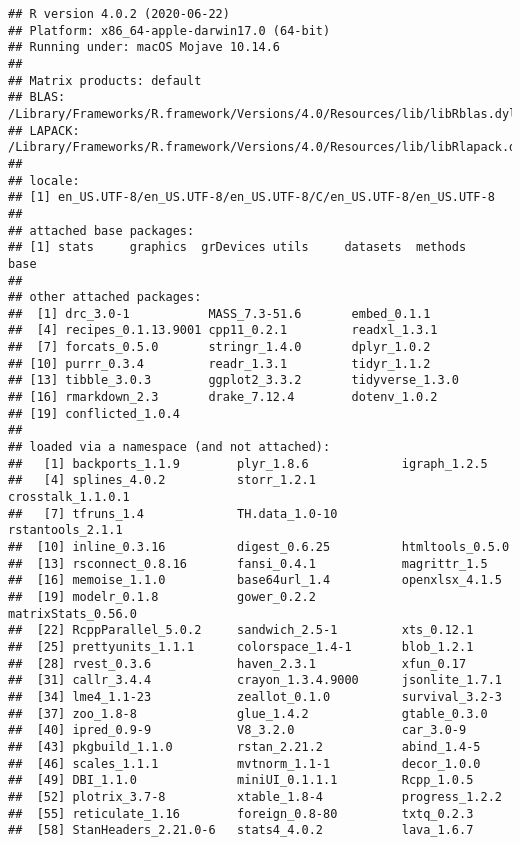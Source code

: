 \documentclass[
]{article}
\begin{document}
\begin{verbatim}
## R version 4.0.2 (2020-06-22)
## Platform: x86_64-apple-darwin17.0 (64-bit)
## Running under: macOS Mojave 10.14.6
## 
## Matrix products: default
## BLAS:   /Library/Frameworks/R.framework/Versions/4.0/Resources/lib/libRblas.dylib
## LAPACK: /Library/Frameworks/R.framework/Versions/4.0/Resources/lib/libRlapack.dylib
## 
## locale:
## [1] en_US.UTF-8/en_US.UTF-8/en_US.UTF-8/C/en_US.UTF-8/en_US.UTF-8
## 
## attached base packages:
## [1] stats     graphics  grDevices utils     datasets  methods   base     
## 
## other attached packages:
##  [1] drc_3.0-1           MASS_7.3-51.6       embed_0.1.1        
##  [4] recipes_0.1.13.9001 cpp11_0.2.1         readxl_1.3.1       
##  [7] forcats_0.5.0       stringr_1.4.0       dplyr_1.0.2        
## [10] purrr_0.3.4         readr_1.3.1         tidyr_1.1.2        
## [13] tibble_3.0.3        ggplot2_3.3.2       tidyverse_1.3.0    
## [16] rmarkdown_2.3       drake_7.12.4        dotenv_1.0.2       
## [19] conflicted_1.0.4   
## 
## loaded via a namespace (and not attached):
##   [1] backports_1.1.9        plyr_1.8.6             igraph_1.2.5          
##   [4] splines_4.0.2          storr_1.2.1            crosstalk_1.1.0.1     
##   [7] tfruns_1.4             TH.data_1.0-10         rstantools_2.1.1      
##  [10] inline_0.3.16          digest_0.6.25          htmltools_0.5.0       
##  [13] rsconnect_0.8.16       fansi_0.4.1            magrittr_1.5          
##  [16] memoise_1.1.0          base64url_1.4          openxlsx_4.1.5        
##  [19] modelr_0.1.8           gower_0.2.2            matrixStats_0.56.0    
##  [22] RcppParallel_5.0.2     sandwich_2.5-1         xts_0.12.1            
##  [25] prettyunits_1.1.1      colorspace_1.4-1       blob_1.2.1            
##  [28] rvest_0.3.6            haven_2.3.1            xfun_0.17             
##  [31] callr_3.4.4            crayon_1.3.4.9000      jsonlite_1.7.1        
##  [34] lme4_1.1-23            zeallot_0.1.0          survival_3.2-3        
##  [37] zoo_1.8-8              glue_1.4.2             gtable_0.3.0          
##  [40] ipred_0.9-9            V8_3.2.0               car_3.0-9             
##  [43] pkgbuild_1.1.0         rstan_2.21.2           abind_1.4-5           
##  [46] scales_1.1.1           mvtnorm_1.1-1          decor_1.0.0           
##  [49] DBI_1.1.0              miniUI_0.1.1.1         Rcpp_1.0.5            
##  [52] plotrix_3.7-8          xtable_1.8-4           progress_1.2.2        
##  [55] reticulate_1.16        foreign_0.8-80         txtq_0.2.3            
##  [58] StanHeaders_2.21.0-6   stats4_4.0.2           lava_1.6.7            

\end{verbatim}
\end{document}
